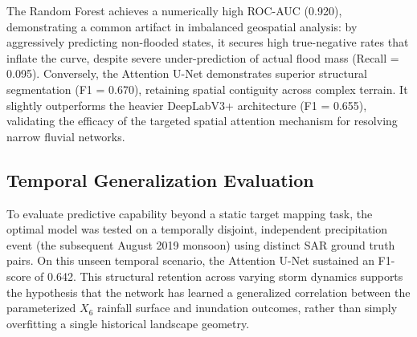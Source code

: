 \documentclass[conference]{IEEEtran}
\begin{document}
\begin{table}[htbp]
\caption{Comparative Benchmarks (Spatial Block Validation Set)}
\begin{center}
\label{tab:results}
\end{center}
\end{table}

The Random Forest achieves a numerically high ROC-AUC (0.920), demonstrating a common artifact in imbalanced geospatial analysis: by aggressively predicting non-flooded states, it secures high true-negative rates that inflate the curve, despite severe under-prediction of actual flood mass (Recall = 0.095).
Conversely, the Attention U-Net demonstrates superior structural segmentation (F1 = 0.670), retaining spatial contiguity across complex terrain. It slightly outperforms the heavier DeepLabV3+ architecture (F1 = 0.655), validating the efficacy of the targeted spatial attention mechanism for resolving narrow fluvial networks.

\subsection{Temporal Generalization Evaluation}
To evaluate predictive capability beyond a static target mapping task, the optimal model was tested on a temporally disjoint, independent precipitation event (the subsequent August 2019 monsoon) using distinct SAR ground truth pairs. On this unseen temporal scenario, the Attention U-Net sustained an F1-score of 0.642. This structural retention across varying storm dynamics supports the hypothesis that the network has learned a generalized correlation between the parameterized $X_6$ rainfall surface and inundation outcomes, rather than simply overfitting a single historical landscape geometry.
\end{document}
